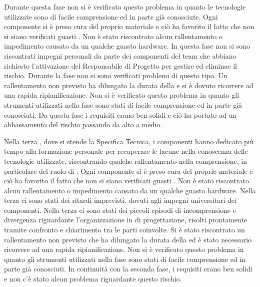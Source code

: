 	
		Durante questa fase non si è verificato questo problema in quanto le tecnologie utilizzate sono di facile comprensione ed in parte già conosciute. 
		Ogni componente si è preso cura del proprio materiale e ciò ha favorito il fatto che non si siano verificati guasti . Non è stato riscontrato alcun rallentamento o impedimento causato da un qualche guasto hardware.
		In questa fase non si sono riscontrati impegni personali da parte dei componenti del team che abbiano richiesto l'attivazione del Responsabile di Progetto per gestire ed eliminae il rischio.
		Durante la fase non si sono verificati problemi di questo tipo.
		Un rallentamento non previsto ha dilungato la durata della  e si è dovuto ricorrere ad una rapida ripianificazione.
		Non si è verificato questo problema in quanto gli strumenti utilizzati nella fase sono stati di facile comprensione ed in parte già conosciuti.
		Da questa fase  i requisiti erano ben solidi e ciò ha portato ad un abbassamento del rischio passando da alto a medio. 



		Nella terza , dove si stende la Specifica Tecnica, i componenti hanno dedicato più tempo alla formazione personale per recuperare le lacune nella conoscenza delle tecnologie utilizzate, riscontrando qualche rallentamento nella comprensione, in particolare del ruolo di .
		Ogni componente si è preso cura del proprio materiale e ciò ha favorito il fatto che non si siano verificati guasti . Non è stato riscontrato alcun rallentamento o impedimento causato da un qualche guasto hardware.
		Nella terza  ci sono stati dei ritardi imprevisti, dovuti agli impegni universitari dei componenti.
		Nella terza  ci sono stati dei piccoli episodi di incomprensione e divergenza riguardante l’organizzazione in  di progettazione, risolti prontamente tramite confronto e chiarimento tra le parti coinvolte.
		Si è stato riscontrato un rallentamento non previsto che ha dilungato la durata della  ed è stato necessario ricorrere ad una rapida ripianificazione.
		Non si è verificato questo problema in quanto gli strumenti utilizzati nella fase sono stati di facile comprensione ed in parte già conosciuti.
		In continuità con la seconda fase, i requisiti erano ben solidi e non c'è stato alcun problema riguardante questo rischio.

